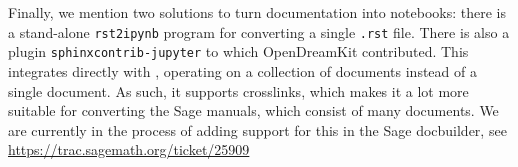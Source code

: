 \documentclass{deliverablereport}
\begin{document}
Finally, we mention two solutions to turn documentation into \Jupyter notebooks:
there is a stand-alone \verb/rst2ipynb/ program for converting a single
\verb/.rst/ file.
There is also a \Sphinx plugin \verb/sphinxcontrib-jupyter/ to which OpenDreamKit
contributed.
This integrates directly with \Sphinx, operating on a collection
of documents instead of a single document.
As such, it supports crosslinks, which makes it a lot more suitable
for converting the Sage manuals, which consist of many documents.
We are currently in the process of adding support for this
in the Sage docbuilder, see \url{https://trac.sagemath.org/ticket/25909}
\end{document}
